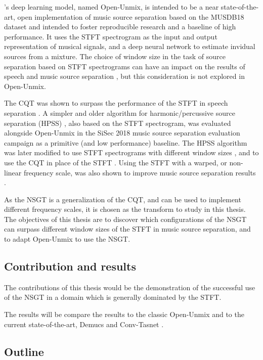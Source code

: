 \documentclass[report.tex]{subfiles}
\begin{document}
\textcite{umx}'s deep learning model, named Open-Unmix, is intended to be a near state-of-the-art, open implementation of music source separation based on the MUSDB18 dataset \cite{musdb18} and intended to foster reproducible research and a baseline of high performance. It uses the STFT spectrogram as the input and output representation of musical signals, and a deep neural network to estimate invidual sources from a mixture. The choice of window size in the task of source separation based on STFT spectrograms can have an impact on the results of speech and music source separation \cite{musicsepwindow}, but this consideration is not explored in Open-Unmix.

The CQT was shown to surpass the performance of the STFT in speech separation \cite{cqtseparation}. A simpler and older algorithm for harmonic/percussive source separation (HPSS) \cite{fitzgerald1}, also based on the STFT spectrogram, was evaluated alongside Open-Unmix in the SiSec 2018 music source separation evaluation campaign \cite{sisec2018} as a primitive (and low performance) baseline. The HPSS algorithm was later modified to use STFT spectrograms with different window sizes \cite{driedger, fitzgerald2}, and to use the CQT in place of the STFT \cite{fitzgerald2}. Using the STFT with a warped, or non-linear frequency scale, was also shown to improve music source separation results \cite{bettermusicsep}.

As the NSGT is a generalization of the CQT, and can be used to implement different frequency scales, it is chosen as the transform to study in this thesis. The objectives of this thesis are to discover which configurations of the NSGT can surpass different window sizes of the STFT in music source separation, and to adapt Open-Unmix to use the NSGT.

\subsection{Contribution and results}

The contributions of this thesis would be the demonstration of the successful use of the NSGT in a domain which is generally dominated by the STFT. 

The results will be compare the results to the classic Open-Unmix and to the current state-of-the-art, Demucs and Conv-Tasnet \cite{demucs}.

\subsection{Outline}
\end{document}
